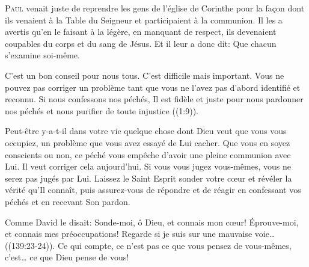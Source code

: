 



\lettrine{P}{aul} venait juste de reprendre
 les gens de l'église de  Corinthe
 pour la fa\c{c}on dont ils venaient à la Table du Seigneur
 et participaient à la communion.
 Il les a avertis qu'en le faisant à la légère,
 en manquant de respect, ils devenaient coupables
 du corps et du sang de Jésus.
 Et il leur a donc dit: 
 \Og Que chacun s'examine soi-même. \Fg{}

C'est un bon conseil pour nous tous. C'est difficile mais important.
 Vous ne pouvez pas corriger un problème tant que vous ne l'avez pas
 d'abord identifié et reconnu.
 \Og Si nous confessons nos péchés, Il est fidèle et juste
 pour nous pardonner nos péchés et nous purifier
 de toute injustice \Fg{} ((1:9)).


Peut-être y-a-t-il dans votre vie quelque chose dont Dieu
 veut que vous vous occupiez, un problème que vous avez essayé
 de Lui cacher.
 Que vous en soyez conscients ou non,
 ce péché vous empêche d'avoir une pleine communion avec Lui.
 Il veut corriger cela aujourd'hui.
 Si vous vous jugez vous-mêmes, vous ne serez pas jugés par Lui.
 Laissez le Saint Esprit sonder votre c\oe{}ur et révéler la vérité
 qu'Il connaît, puis assurez-vous de répondre et de réagir
 en confessant vos péchés et en recevant Son pardon.

Comme David le disait: 
 \Og Sonde-moi, ô Dieu, et connais mon c\oe{}ur!
 Éprouve-moi, et connais mes préoccupations!
 Regarde si je suis sur une mauvaise voie\dots{} \Fg{}
 ((139:23-24)).
 Ce qui compte, ce n'est pas ce que vous pensez de vous-mêmes,
 c'est\dots{} ce que Dieu pense de vous!

\dvrule




